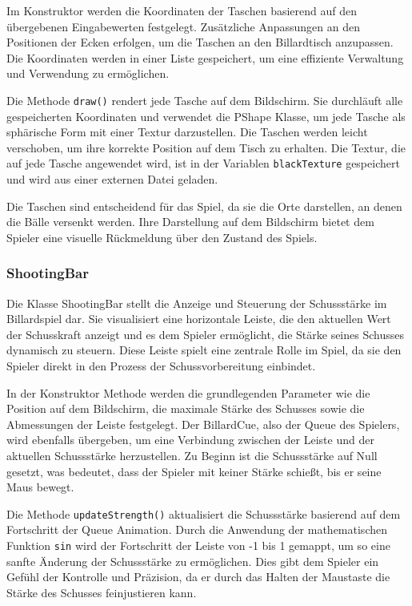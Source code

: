 \documentclass[a4paper,12pt]{article}
\begin{document}
Im Konstruktor werden die Koordinaten der Taschen basierend auf den übergebenen Eingabewerten festgelegt. Zusätzliche Anpassungen an den Positionen der Ecken erfolgen, um die Taschen an den Billardtisch anzupassen. Die Koordinaten werden in einer Liste gespeichert, um eine effiziente Verwaltung und Verwendung zu ermöglichen.

Die Methode \texttt{draw()} rendert jede Tasche auf dem Bildschirm. Sie durchläuft alle gespeicherten Koordinaten und verwendet die PShape Klasse, um jede Tasche als sphärische Form mit einer Textur darzustellen. Die Taschen werden leicht verschoben, um ihre korrekte Position auf dem Tisch zu erhalten. Die Textur, die auf jede Tasche angewendet wird, ist in der Variablen \texttt{blackTexture} gespeichert und wird aus einer externen Datei geladen.

Die Taschen sind entscheidend für das Spiel, da sie die Orte darstellen, an denen die Bälle versenkt werden. Ihre Darstellung auf dem Bildschirm bietet dem Spieler eine visuelle Rückmeldung über den Zustand des Spiels.

	
	\subsubsection{ShootingBar}
	Die Klasse ShootingBar stellt die Anzeige und Steuerung der Schussstärke im Billardspiel dar. Sie visualisiert eine horizontale Leiste, die den aktuellen Wert der Schusskraft anzeigt und es dem Spieler ermöglicht, die Stärke seines Schusses dynamisch zu steuern. Diese Leiste spielt eine zentrale Rolle im Spiel, da sie den Spieler direkt in den Prozess der Schussvorbereitung einbindet.
	
	In der Konstruktor Methode werden die grundlegenden Parameter wie die Position auf dem Bildschirm, die maximale Stärke des Schusses sowie die Abmessungen der Leiste festgelegt. Der BillardCue, also der Queue des Spielers, wird ebenfalls übergeben, um eine Verbindung zwischen der Leiste und der aktuellen Schussstärke herzustellen. Zu Beginn ist die Schussstärke auf Null gesetzt, was bedeutet, dass der Spieler mit keiner Stärke schießt, bis er seine Maus bewegt.
	
	Die Methode \texttt{updateStrength()} aktualisiert die Schussstärke basierend auf dem Fortschritt der Queue Animation. Durch die Anwendung der mathematischen Funktion \texttt{sin} wird der Fortschritt der Leiste von -1 bis 1 gemappt, um so eine sanfte Änderung der Schussstärke zu ermöglichen. Dies gibt dem Spieler ein Gefühl der Kontrolle und Präzision, da er durch das Halten der Maustaste die Stärke des Schusses feinjustieren kann.
	
\end{document}
